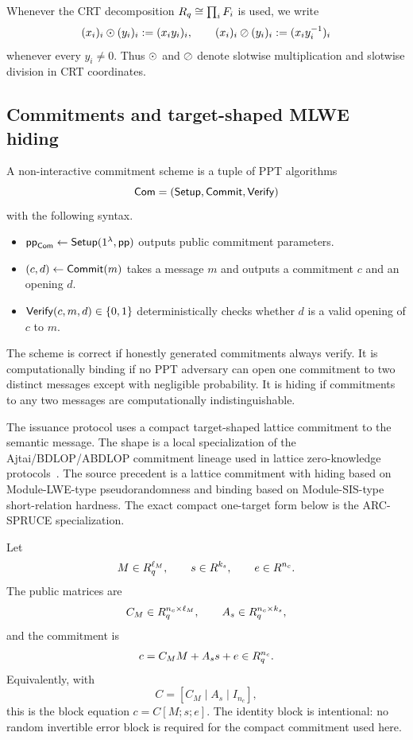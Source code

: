 Whenever the CRT decomposition \(R_q\cong\prod_i F_i\) is used, we write
\[
  (x_i)_i\odot(y_i)_i := (x_i y_i)_i,
  \qquad
  (x_i)_i\oslash (y_i)_i := (x_i y_i^{-1})_i
\]
whenever every \(y_i\neq 0\).  Thus \(\odot\) and \(\oslash\) denote slotwise multiplication and slotwise division in
CRT coordinates.

\subsection{Commitments and target-shaped MLWE hiding}
\label{subsec:prelim-commit}
\label{subsec:commitments}

\begin{definition}\label{def:commitment-scheme}
A non-interactive commitment scheme is a tuple of PPT algorithms
\[
  \mathsf{Com}=(\mathsf{Setup},\mathsf{Commit},\mathsf{Verify})
\]
with the following syntax.
\begin{itemize}[leftmargin=1.25em]
  \item \(\mathsf{pp}_{\mathsf{Com}}\gets \mathsf{Setup}(1^\lambda,\mathsf{pp})\) outputs public commitment parameters.
  \item \((c,d)\gets \mathsf{Commit}(m)\) takes a message \(m\) and outputs a commitment \(c\) and an opening \(d\).
  \item \(\mathsf{Verify}(c,m,d)\in\{0,1\}\) deterministically checks whether \(d\) is a valid opening of \(c\) to \(m\).
\end{itemize}
The scheme is correct if honestly generated commitments always verify.  It is computationally binding if no PPT
adversary can open one commitment to two distinct messages except with negligible probability.  It is hiding if
commitments to any two messages are computationally indistinguishable.
\end{definition}

The issuance protocol uses a compact target-shaped lattice commitment to the semantic message.  The shape is a
local specialization of the Ajtai/BDLOP/ABDLOP commitment lineage used in lattice zero-knowledge
protocols~\cite{BDLOP18,LNP22}.  The source precedent is a lattice commitment with hiding based on
Module-LWE-type pseudorandomness and binding based on Module-SIS-type short-relation hardness.  The exact compact
one-target form below is the ARC-SPRUCE specialization.

Let
\[
  M\in R_q^{\ell_M},\qquad s\in R^{k_s},\qquad e\in R^{n_c}.
\]
The public matrices are
\[
  C_M\in R_q^{n_c\times \ell_M},
  \qquad
  A_s\in R_q^{n_c\times k_s},
\]
and the commitment is
\begin{equation}
  c=C_M M+A_s s+e\in R_q^{n_c}.
  \label{eq:target-commitment}
\end{equation}
Equivalently, with
\[
  C=[C_M\mid A_s\mid I_{n_c}],
\]
this is the block equation \(c=C[M;s;e]\).  The identity block is intentional: no random invertible error block is
required for the compact commitment used here.

